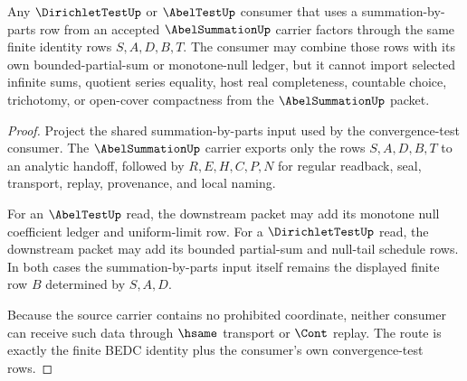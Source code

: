 \begin{theorem}
\label{thm:abel-summation-dirichlet-test-route}
Any $\DirichletTestUp$ or $\AbelTestUp$ consumer that uses a summation-by-parts row from an accepted $\AbelSummationUp$ carrier factors through the same finite identity rows $S,A,D,B,T$. The consumer may combine those rows with its own bounded-partial-sum or monotone-null ledger, but it cannot import selected infinite sums, quotient series equality, host real completeness, countable choice, trichotomy, or open-cover compactness from the $\AbelSummationUp$ packet.
\end{theorem}
\begin{proof}
Project the shared summation-by-parts input used by the convergence-test consumer. The $\AbelSummationUp$ carrier exports only the rows $S,A,D,B,T$ to an analytic handoff, followed by $R,E,H,C,P,N$ for regular readback, seal, transport, replay, provenance, and local naming.

For an $\AbelTestUp$ read, the downstream packet may add its monotone null coefficient ledger and uniform-limit row. For a $\DirichletTestUp$ read, the downstream packet may add its bounded partial-sum and null-tail schedule rows. In both cases the summation-by-parts input itself remains the displayed finite row $B$ determined by $S,A,D$.

Because the source carrier contains no prohibited coordinate, neither consumer can receive such data through $\hsame$ transport or $\Cont$ replay. The route is exactly the finite BEDC identity plus the consumer's own convergence-test rows.
\end{proof}



